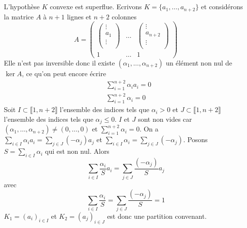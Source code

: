 \documentclass{report}
\begin{document}
\subsection{} \noindent{}\\ 
\\ 
\\
\noindent L'hypothèse $K$ convexe est superflue. Ecrivons $K=\{a_1,\ldots, a_{n+2}\}$ et considérons la matrice $A$ à $n+1$ lignes et $n+2$ colonnes 
$$A=\begin{pmatrix}
\begin{pmatrix}
\vdots \\
a_1\\
\vdots\\
\end{pmatrix} & \hdots & \begin{pmatrix}
\vdots \\
a_{n+2}\\
\vdots\\
\end{pmatrix} \\
1 & \hdots & 1
\end{pmatrix}$$
Elle n'est pas inversible donc il existe $(\alpha_1,\ldots,\alpha_{n+2})$ un élément non nul de $\ker A$, ce qu'on peut encore écrire $$\begin{aligned} &\sum_{i=1}^{n+2} \alpha_i a_i =0 \\
&\sum_{i=1}^{n+2} \alpha_i =0 \end{aligned}$$
Soit $I\subset \llbracket 1,n+2 \rrbracket$ l'ensemble des indices tels que $\alpha_i>0$ et $J\subset \llbracket 1,n+2 \rrbracket$ l'ensemble des indices tels que $\alpha_j\leq 0$. $I$ et $J$ sont non vides car $(\alpha_1,\ldots,\alpha_{n+2})\neq (0,\ldots,0)$ et $\sum_{i=1}^{n+2} \alpha_i =0$.\newline \newline
On a $\sum_{i\in I} \alpha_i a_i = \sum_{j\in J} (-\alpha_j)a_j$ et $\sum_{i\in I} \alpha_i = \sum_{j\in J} (-\alpha_j)$.\newline \newline
Posons $S=\sum_{i\in I} \alpha_i$ qui est non nul. Alors 
$$\sum_{i\in I} \frac{\alpha_i}{S} a_i = \sum_{j\in J} \frac{(-\alpha_j)}{S} a_j$$
 avec $$ \sum_{i\in I} \frac{\alpha_i}{S} = \sum_{j\in J} \frac{(-\alpha_j)}{S}=1$$
$K_1=(a_i)_{i\in I}$ et $K_2=(a_j)_{i\in J}$ est donc une partition convenant.
\end{document}
